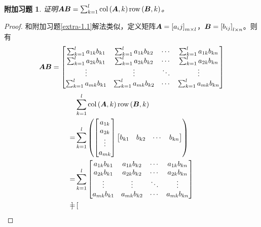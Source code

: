\documentclass{ctexart}
\newtheorem{extraprob}{附加习题}[section]
\begin{document}
\begin{extraprob}
    证明\(\boldsymbol{A}\boldsymbol{B}=\sum_{k=1}^l\mathrm{col}\left( \boldsymbol{A},k \right)\mathrm{row}\left( \boldsymbol{B},k \right)\)。
\end{extraprob}
\begin{proof}
    和附加习题\ref{extra-1.1}解法类似，定义矩阵\(\boldsymbol{A}=\left[ a_ij \right]_{m\times l}\)，\(\boldsymbol{B}=\left[ b_{ij} \right]_{l\times n}\)。则有
    \begin{equation*}
        \boldsymbol{A}\boldsymbol{B}=
        \begin{bmatrix}
            \sum_{k=1}^la_{1k}b_{k1} & \sum_{k=1}^la_{1k}b_{k2} & \cdots & \sum_{k=1}^la_{1k}b_{kn} \\
            \sum_{k=1}^la_{2k}b_{k1} & \sum_{k=1}^la_{2k}b_{k2} & \cdots & \sum_{k=1}^la_{2k}b_{kn} \\
            \vdots                   & \vdots                   & \ddots & \vdots                   \\
            \sum_{k=1}^la_{mk}b_{k1} & \sum_{k=1}^la_{mk}b_{k2} & \cdots & \sum_{k=1}^la_{mk}b_{kn}
        \end{bmatrix}
    \end{equation*}
    \begin{align*}
          & \sum_{k=1}^l\mathrm{col}\left( \boldsymbol{A},k \right)\mathrm{row}\left( \boldsymbol{B},k \right) \\ =&\sum_{k=1}^l
        \left( 
            \begin{bmatrix}
                a_{1k} \\a_{2k}\\\vdots\\a_{mk}
            \end{bmatrix}
            \begin{bmatrix}
                b_{k1} & b_{k2} & \cdots & b_{kn}
            \end{bmatrix}
         \right)                                            \\
        = & \sum_{k=1}^l
        \begin{bmatrix}
            a_{1k}b_{k1} & a_{1k}b_{k2} & \cdots & a_{1k}b_{kn} \\
            a_{2k}b_{k1} & a_{2k}b_{k2} & \cdots & a_{2k}b_{kn} \\
            \vdots       & \vdots       & \ddots & \vdots       \\
            a_{mk}b_{k1} & a_{mk}b_{k2} & \cdots & a_{mk}b_{kn}
        \end{bmatrix}                  \\
        = &
        \begin{bmatrix}

\end{bmatrix}
\end{align*}
\end{proof}
\end{document}

